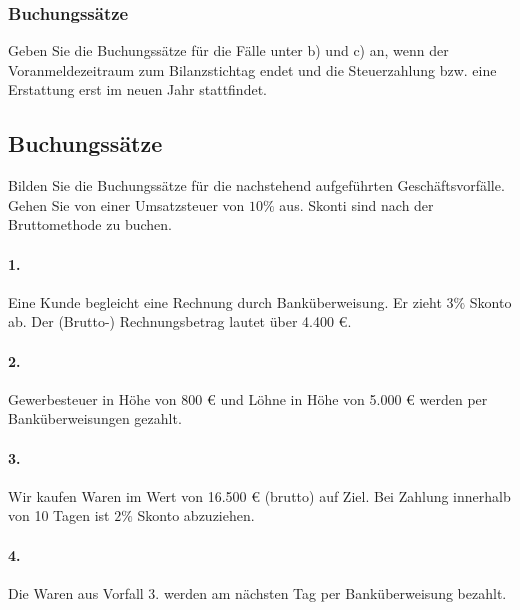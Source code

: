 \documentclass[paper=a4, fontsize=11pt]{scrartcl}
\numberwithin{equation}{section}
\numberwithin{figure}{section}
\numberwithin{table}{section}
\begin{document}
{\subsubsection{Buchungssätze}

Geben Sie die Buchungssätze für die Fälle unter b) und c) an, wenn der Voranmeldezeitraum zum Bilanzstichtag endet und die Steuerzahlung bzw. eine Erstattung erst im neuen Jahr stattfindet.


\subsection{Buchungssätze}

Bilden Sie die Buchungssätze für die nachstehend aufgeführten Geschäftsvorfälle. Gehen Sie von einer Umsatzsteuer von $10 \%$ aus. Skonti sind nach der Bruttomethode zu buchen.

\paragraph{1.}

Eine Kunde begleicht eine Rechnung durch Banküberweisung. Er zieht $3 \%$ Skonto ab. Der (Brutto-) Rechnungsbetrag lautet über 4.400 €. \\

\paragraph{2.}

Gewerbesteuer in Höhe von 800 € und Löhne in Höhe von 5.000 € werden per Banküberweisungen gezahlt. \\

\paragraph{3.}

Wir kaufen Waren im Wert von 16.500 € (brutto) auf Ziel. Bei Zahlung innerhalb von 10 Tagen ist $2 \%$ Skonto abzuziehen. \\

\paragraph{4.}

Die Waren aus Vorfall 3. werden am nächsten Tag per Banküberweisung bezahlt. \\

}
\end{document}
